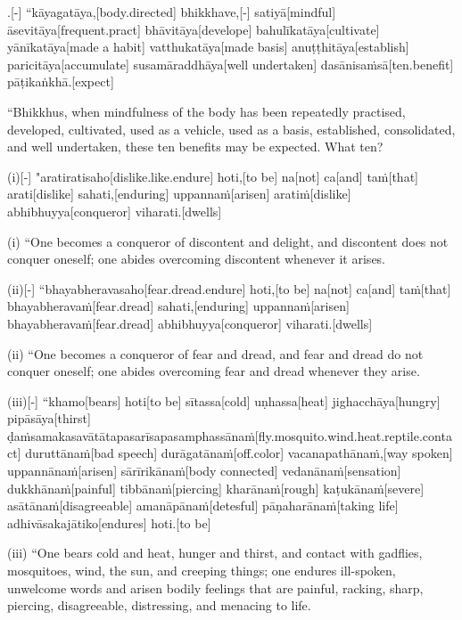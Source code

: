 \begin{samepage}
.[-] “kāyagatāya,[body.directed] bhikkhave,[-] satiyā[mindful] āsevitāya[frequent.pract] bhāvitāya[develope] bahulīkatāya[cultivate] yānīkatāya[made a habit] vatthukatāya[made basis] anuṭṭhitāya[establish] paricitāya[accumulate] susamāraddhāya[well undertaken] dasānisaṁsā[ten.benefit] pāṭikaṅkhā.[expect]
\endgl
\nopagebreak
\linespread{0.5}
\begin{spacin}{0.2}
{\PaliGlossFT “Bhikkhus, when mindfulness of the body has been repeatedly practised, developed, cultivated, used as a vehicle, used as a basis, established, consolidated, and well undertaken, these ten benefits may be expected. What ten?}
\end{spacin}
\vskip 12pt
\end{samepage}
\begin{samepage}
\begingl[glneveryline={\PaliGlossA,\PaliGlossB}]
(i)[-] "aratiratisaho[dislike.like.endure] hoti,[to be] na[not] ca[and] taṁ[that] arati[dislike] sahati,[enduring] uppannaṁ[arisen] aratiṁ[dislike] abhibhuyya[conqueror] viharati.[dwells]
\endgl
\nopagebreak
\linespread{0.5}
\begin{spacin}{0.2}
{\PaliGlossFT (i) “One becomes a conqueror of discontent and delight, and discontent does not conquer oneself; one abides overcoming discontent whenever it arises.}
\end{spacin}
\vskip 12pt
\end{samepage}
\begin{samepage}
\begingl[glneveryline={\PaliGlossA,\PaliGlossB}]
(ii)[-] “bhayabheravasaho[fear.dread.endure] hoti,[to be] na[not] ca[and] taṁ[that] bhayabheravaṁ[fear.dread] sahati,[enduring] uppannaṁ[arisen] bhayabheravaṁ[fear.dread] abhibhuyya[conqueror] viharati.[dwells]
\endgl
\nopagebreak
\linespread{0.5}
\begin{spacin}{0.2}
{\PaliGlossFT (ii) “One becomes a conqueror of fear and dread, and fear and dread do not conquer oneself; one abides overcoming fear and dread whenever they arise.}
\end{spacin}
\vskip 12pt
\end{samepage}
\begin{samepage}
\begingl[glneveryline={\PaliGlossA,\PaliGlossB}]
(iii)[-] “khamo[bears] hoti[to be] sītassa[cold] uṇhassa[heat] jighacchāya[hungry] pipāsāya[thirst] ḍaṁsamakasavātātapasarīsapasamphassānaṁ[fly.mosquito.wind.heat.reptile.contact] duruttānaṁ[bad speech] durāgatānaṁ[off.color] vacanapathānaṁ,[way spoken] uppannānaṁ[arisen] sārīrikānaṁ[body connected] vedanānaṁ[sensation] dukkhānaṁ[painful] tibbānaṁ[piercing] kharānaṁ[rough] kaṭukānaṁ[severe] asātānaṁ[disagreeable] amanāpānaṁ[detesful] pāṇaharānaṁ[taking life] adhivāsakajātiko[endures] hoti.[to be]
\endgl
\nopagebreak
\linespread{0.5}
\begin{spacin}{0.2}
{\PaliGlossFT (iii) “One bears cold and heat, hunger and thirst, and contact with gadflies, mosquitoes, wind, the sun, and creeping things; one endures ill-spoken, unwelcome words and arisen bodily feelings that are painful, racking, sharp, piercing, disagreeable, distressing, and menacing to life.}
\end{spacin}
\vskip 12pt
\end{samepage}
